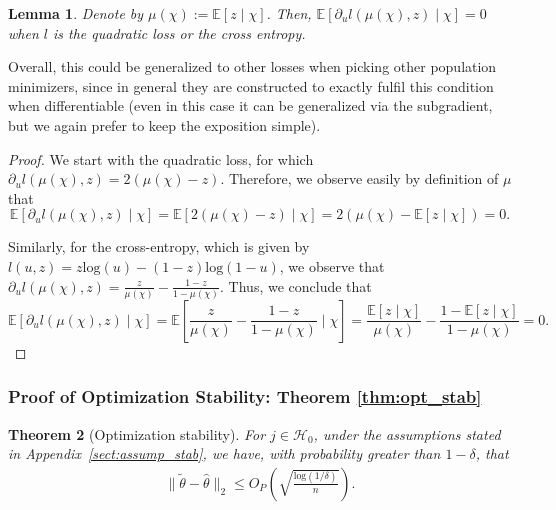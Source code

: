 \documentclass{article}
\theoremstyle{plain}
\newtheorem{theorem}{Theorem}[section]
\newtheorem{lemma}[theorem]{Lemma}
\theoremstyle{definition}
\theoremstyle{remark}
\newcommand{\e}[1]{\mathbb{E}\left[#1\right]  } %
\begin{document}
 \begin{lemma}\label{lemm:population_minim}
 Denote by $\mu(\chi):=\e{z\mid \chi}$. Then, $\e{\partial_u l(\mu(\chi), z)\mid \chi}=0\;$ when $l$ is the quadratic loss or the cross entropy.
 \end{lemma}
 Overall, this could be generalized to other losses when picking other population minimizers, since in general they are constructed to exactly fulfil this condition when differentiable (even in this case it can be generalized via the subgradient, but we again prefer to keep the exposition simple).
 \begin{proof}
 We start with the quadratic loss, for which $\partial_u l(\mu(\chi), z)=2(\mu(\chi)-z)$. Therefore, we observe easily by definition of $\mu$ that 
 $$\e{\partial_u l(\mu(\chi), z)\mid \chi}=\e{2(\mu(\chi)-z)\mid \chi}=2(\mu(\chi)-\e{z\mid \chi})=0.$$
 
 Similarly, for the cross-entropy, which is given by $l(u, z)=z\mathrm{log}(u)-(1-z)\mathrm{log}(1-u)$, we observe that $\partial_u l(\mu(\chi), z)=\frac{z}{\mu(\chi)}-\frac{1-z}{1-\mu(\chi)}$. Thus, we conclude that 
  $$\e{\partial_u l(\mu(\chi), z)\mid \chi}=\e{\frac{z}{\mu(\chi)}-\frac{1-z}{1-\mu(\chi)}\mid \chi}=\frac{\e{z\mid \chi}}{\mu(\chi)}-\frac{1-\e{z\mid \chi}}{1-\mu(\chi)}=0.$$
 \end{proof}
 
 
 
\subsubsection{Proof of Optimization Stability: Theorem \ref{thm:opt_stab}}\label{sect:proof_stab}

 \begin{theorem}[Optimization stability]
For $j \in \mathcal{H}_0$, under the assumptions stated in Appendix~\ref{sect:assump_stab}, we have, with probability greater than $1-\delta$, that
 \begin{align}
     \|\widetilde{\theta}-\widehat{\theta}\|_2\leq O_P\left(\sqrt{\frac{\mathrm{log}(1/\delta)}{n}}\right).
 \end{align}
 \end{theorem}
\end{document}
